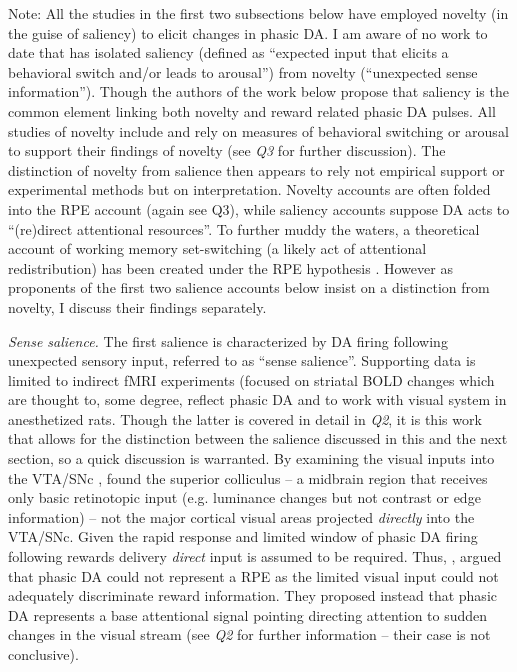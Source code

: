 \documentclass[doc]{apa}        %
\begin{document}
Note: All the studies in the first two subsections below have employed novelty (in the guise of saliency) to elicit changes in phasic DA.  I am aware of no work to date that has isolated saliency (defined as ``expected input that elicits a behavioral switch and/or leads to arousal'') from novelty (``unexpected sense information'').  Though the authors of the work below propose that saliency is the common element linking both novelty and reward related phasic DA pulses.  All studies of novelty include and rely on measures of behavioral switching or arousal to support their findings of novelty (see \emph{Q3} for further discussion).  The distinction of novelty from salience then appears to rely not empirical support or experimental methods but on interpretation.  Novelty accounts are often folded into the RPE account (again see Q3), while saliency accounts suppose DA acts to ``(re)direct attentional resources''.  To further muddy the waters, a theoretical account of working memory set-switching (a likely act of attentional redistribution) has been created under the RPE hypothesis \cite{OReilly:2006p2615,Ponzi:2008p751}.  However as proponents of the first two salience accounts below insist on a distinction from novelty, I discuss their findings separately.

\emph{Sense salience.}
The first salience is characterized by DA firing following unexpected sensory input, referred to as ``sense salience''.  Supporting data is limited to indirect fMRI experiments (focused on striatal BOLD changes which are thought to, some degree, reflect phasic DA \cite{Schonberg:2009p6669,Surmeier:2007p4435} and to work with visual system in anesthetized rats.  Though the latter is covered in detail in \emph{Q2}, it is this work that allows for the distinction between the salience discussed in this and the next section, so a quick discussion is warranted.   By examining the visual inputs into the VTA/SNc , found the superior colliculus -- a midbrain region that receives only basic retinotopic input (e.g. luminance changes but not contrast or edge information) -- not the major cortical visual areas projected \emph{directly} into the VTA/SNc.  Given the rapid response and limited window of phasic DA firing following rewards delivery \emph{direct} input is assumed to be required.  Thus, , argued that phasic DA could not represent a RPE as the limited visual input could not adequately discriminate reward information.  They proposed instead that phasic DA represents a base attentional signal pointing directing attention to sudden changes in the visual stream (see \emph{Q2} for further information -- their case is not conclusive).
\end{document}
